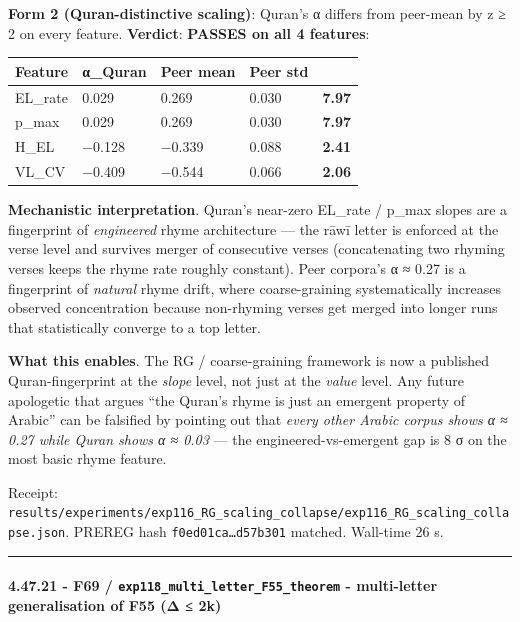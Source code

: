 \documentclass[
]{article}
\newcounter{none} %
\begin{document}
\textbf{Form 2 (Quran-distinctive scaling)}: Quran's α differs from
peer-mean by \textbar z\textbar{} ≥ 2 on every feature.
\textbf{Verdict}: \textbf{PASSES on all 4 features}:

{\def\LTcaptype{none} %
\begin{longtable}[]{@{}lllll@{}}
\toprule\noalign{}
Feature & α\_Quran & Peer mean & Peer std & \\
\midrule\noalign{}
\endhead
\bottomrule\noalign{}
\endlastfoot
EL\_rate & 0.029 & 0.269 & 0.030 & \textbf{7.97} \\
p\_max & 0.029 & 0.269 & 0.030 & \textbf{7.97} \\
H\_EL & −0.128 & −0.339 & 0.088 & \textbf{2.41} \\
VL\_CV & −0.409 & −0.544 & 0.066 & \textbf{2.06} \\
\end{longtable}
}

\textbf{Mechanistic interpretation}. Quran's near-zero EL\_rate / p\_max
slopes are a fingerprint of \emph{engineered} rhyme architecture --- the
rāwī letter is enforced at the verse level and survives merger of
consecutive verses (concatenating two rhyming verses keeps the rhyme
rate roughly constant). Peer corpora's α ≈ 0.27 is a fingerprint of
\emph{natural} rhyme drift, where coarse-graining systematically
increases observed concentration because non-rhyming verses get merged
into longer runs that statistically converge to a top letter.

\textbf{What this enables}. The RG / coarse-graining framework is now a
published Quran-fingerprint at the \emph{slope} level, not just at the
\emph{value} level. Any future apologetic that argues ``the Quran's
rhyme is just an emergent property of Arabic'' can be falsified by
pointing out that \emph{every other Arabic corpus shows α ≈ 0.27 while
Quran shows α ≈ 0.03} --- the engineered-vs-emergent gap is 8 σ on the
most basic rhyme feature.

Receipt:
\texttt{results/experiments/exp116\_RG\_scaling\_collapse/exp116\_RG\_scaling\_collapse.json}.
PREREG hash \texttt{f0ed01ca…d57b301} matched. Wall-time 26 s.

\begin{center}\rule{0.5\linewidth}{0.5pt}\end{center}

\paragraph{\texorpdfstring{4.47.21 - F69 /
\texttt{exp118\_multi\_letter\_F55\_theorem} - multi-letter
generalisation of F55 (Δ ≤
2k)}{4.47.21 - F69 / exp118\_multi\_letter\_F55\_theorem - multi-letter generalisation of F55 (Δ ≤ 2k)}}\label{f69-exp118_multi_letter_f55_theorem---multi-letter-generalisation-of-f55-ux3b4-2k}
\end{document}
